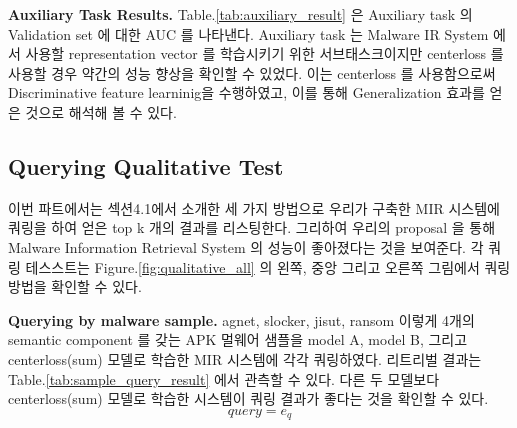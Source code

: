\textbf{Auxiliary Task Results. }
Table.\ref{tab:auxiliary_result} 은 Auxiliary task 의 Validation set 에 대한 AUC 를 나타낸다. Auxiliary task 는 Malware IR System 에서 사용할 representation vector 를 학습시키기 위한 서브태스크이지만 centerloss 를 사용할 경우 약간의 성능 향상을 확인할 수 있었다. 이는 centerloss 를 사용함으로써 Discriminative feature learninig\cite{wen2016discriminative}을 수행하였고, 이를 통해 Generalization 효과를 얻은 것으로 해석해 볼 수 있다.


\subsection{Querying Qualitative Test}
이번 파트에서는 섹션4.1에서 소개한 세 가지 방법으로 우리가 구축한 MIR 시스템에 쿼링을 하여 얻은 top k 개의 결과를 리스팅한다. 그리하여 우리의 proposal 을 통해 Malware Information Retrieval System 의 성능이 좋아졌다는 것을 보여준다. 각 쿼링 테스스트는 Figure.\ref{fig:qualitative_all} 의 왼쪽, 중앙 그리고 오른쪽 그림에서 쿼링 방법을 확인할 수 있다.

\textbf{Querying by malware sample. }
agnet, slocker, jisut, ransom 이렇게 4개의 semantic component 를 갖는 APK 멀웨어 샘플을 model A, model B, 그리고 centerloss(sum) 모델로 학습한 MIR 시스템에 각각 쿼링하였다. 리트리벌 결과는 Table.\ref{tab:sample_query_result} 에서 관측할 수 있다. 다른 두 모델보다 centerloss(sum) 모델로 학습한 시스템이 쿼링 결과가 좋다는 것을 확인할 수 있다. 
\[
   query = e_q 
\]


